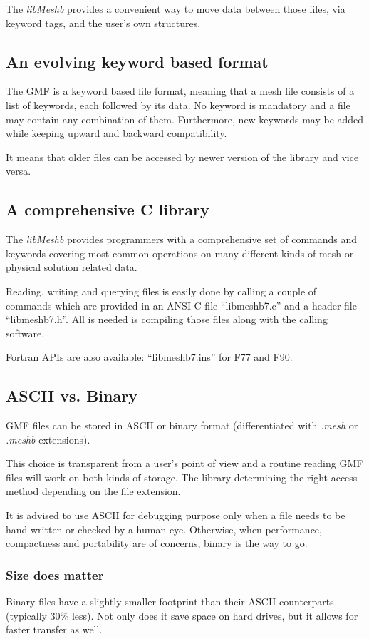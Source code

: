 \documentclass[a4paper,12pt]{article}
\begin{document}
The \emph{libMeshb} provides a convenient way to move data between those files, via keyword tags, and the user's own structures.


\subsection{An evolving keyword based format}
The GMF is a keyword based file format, meaning that a mesh file consists of a list of keywords, each followed by its data. No keyword is mandatory and a file may contain any combination of them. Furthermore, new keywords may be added while keeping upward and backward compatibility.

It means that older files can be accessed by newer version of the library and vice versa.


\subsection{A comprehensive C library}
The \emph{libMeshb} provides programmers with a comprehensive set of commands and keywords covering most common operations on many different kinds of mesh or physical solution related data.

Reading, writing and querying files is easily done by calling a couple of commands which are provided in an ANSI C file ``libmeshb7.c'' and a header file ``libmeshb7.h''. All is needed is compiling those files along with the calling software.

Fortran APIs are also available: ``libmeshb7.ins'' for F77 and F90.


\subsection{ASCII vs. Binary}
GMF files can be stored in ASCII or binary format (differentiated with \emph{.mesh} or \emph{.meshb} extensions).

This choice is transparent from a user's point of view and a routine reading GMF files will work on both kinds of storage.
The library determining the right access method depending on the file extension.

It is advised to use ASCII for debugging purpose only when a file needs to be hand-written or checked by a human eye. Otherwise, when performance, compactness and portability are of concerns, binary is the way to go.


\subsubsection{Size does matter}
Binary files have a slightly smaller footprint than their ASCII counterparts (typically 30\% less). Not only does it save space on hard drives, but it allows for faster transfer as well.
\end{document}
